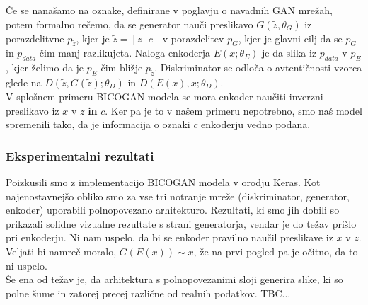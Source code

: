 \documentclass[12pt,a4paper,twoside]{article}
\theoremstyle{definition} %
\theoremstyle{plain} %
\numberwithin{equation}{section}  %
\begin{document}
Če se nanašamo na oznake, definirane v poglavju o navadnih GAN mrežah, 
potem formalno rečemo, da se generator nauči preslikavo $G(\tilde{z},\theta_G)$ iz porazdelitvne $p_{\tilde{z}}$, kjer je $\tilde{z} = [z \text{ } c]$ v 
porazdelitev $p_G$, kjer je glavni cilj da se $p_G$ in $p_{data}$ čim manj razlikujeta.  Naloga enkoderja $E(x;\theta_E)$ je da slika iz $p_{data}$ v $p_{E}$, kjer želimo da je $p_E$ čim bližje $p_{\tilde{z}}$. Diskriminator  se odloča o avtentičnosti vzorca glede na  $D(\tilde{z},G(\tilde{z});\theta_D)$ in $D(E(x),x;\theta_D)$. 
\\ V splošnem primeru BICOGAN modela  se mora enkoder  naučiti inverzni preslikavo iz $x$ v $z$ \textbf{in} $c$. Ker pa  je to v našem primeru nepotrebno, smo naš model spremenili tako, da je informacija o oznaki $c$ enkoderju vedno podana. 
\subsubsection{Eksperimentalni rezultati}

Poizkusili smo z implementacijo BICOGAN modela v orodju Keras. Kot najenostavnejšo obliko smo za vse tri notranje mreže (diskriminator, generator, enkoder) uporabili polnopovezano arhitekturo. Rezultati, ki smo jih dobili so prikazali solidne vizualne rezultate s strani generatorja, vendar je do težav prišlo pri enkoderju. Ni nam uspelo, da bi se enkoder pravilno naučil preslikave iz $x$ v $z$. Veljati bi namreč moralo, $G(E(x)) \sim  x$, že na prvi pogled pa je očitno, da to ni uspelo. 
\\
Še ena od težav je, da arhitektura s polnopovezanimi sloji generira slike, ki so polne šume in zatorej precej različne od realnih podatkov. 
TBC... 
\end{document}
